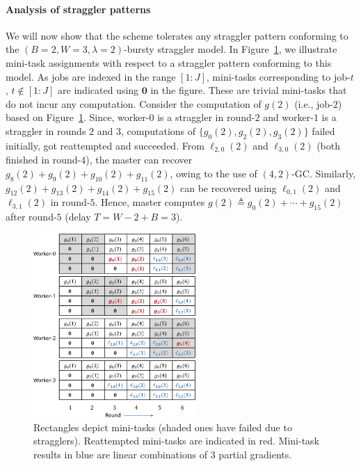 \paragraph{Analysis of straggler patterns} We will now show that the scheme tolerates any straggler pattern conforming to the $(B=2,W=3,\lambda=2)$-bursty straggler model. In Figure~\ref{ch2:fig:const_b_sgc_example}, we illustrate mini-task assignments with respect to a straggler pattern conforming to this model. As jobs are indexed in the range $[1:J]$,  mini-tasks corresponding to job-$t$, $t\notin[1:J]$ are indicated using $\mathbf{0}$ in the figure. These are trivial mini-tasks that do not incur any computation. Consider the computation of $g(2)$ (i.e., job-$2$) based on Figure~\ref{ch2:fig:const_b_sgc_example}. Since, worker-$0$ is a straggler in round-$2$ and worker-$1$ is a straggler in rounds $2$ and $3$, computations of $\{g_{0}(2),g_{2}(2),g_{3}(2)\}$ failed initially, got reattempted and succeeded. From $\ell_{2,0}(2)$ and  $\ell_{3,0}(2)$ (both finished in round-$4$),  the master can recover  $g_{8}(2)+g_{9}(2)+g_{10}(2)+g_{11}(2)$, owing to the use of $(4,2)$-GC. Similarly, $g_{12}(2)+g_{13}(2)+g_{14}(2)+g_{15}(2)$ can be recovered using $\ell_{0,1}(2)$ and $\ell_{3,1}(2)$ in round-$5$. Hence, master computes $g(2)\triangleq g_0(2)+\cdots+g_{15}(2)$ after round-$5$ (delay  $T=W-2+B=3$).

\begin{figure}
    \centering
    \includegraphics[width=0.55\textwidth]{figs/ch2/fig_B_SGC_example_mini_task_assignment_v2}
    \caption{
        Rectangles depict mini-tasks (shaded ones have failed due to stragglers).  Reattempted mini-tasks are indicated in red. Mini-task results in blue are linear combinations of $3$ partial gradients.
    }
    \label{ch2:fig:const_b_sgc_example}
\end{figure}


